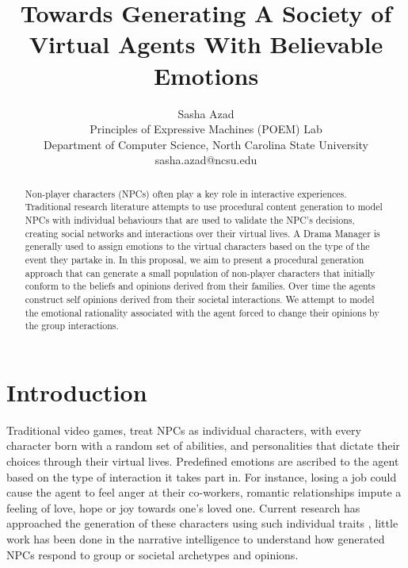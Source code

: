 \documentclass[letterpaper]{article}
\begin{document}
%

\title{Towards Generating A Society of Virtual Agents With Believable Emotions}
\author{Sasha Azad\\
    Principles of Expressive Machines (POEM) Lab \\ 
    Department of Computer Science, North Carolina State University\\
	sasha.azad@ncsu.edu\\
}
\maketitle

\begin{abstract}
Non-player characters (NPCs) often play a key role in interactive experiences. Traditional research literature attempts to use procedural content generation to model NPCs with individual behaviours that are used to validate the NPC's decisions, creating social networks and interactions over their virtual lives. A Drama Manager is generally used to assign emotions to the virtual characters based on the type of the event they partake in. In this proposal, we aim to present a procedural generation approach that can generate a small population of non-player characters that initially conform to the beliefs and opinions derived from their families. Over time the agents construct self opinions derived from their societal interactions. We attempt to model the emotional rationality associated with the agent forced to change their opinions by the group interactions.
\end{abstract}
 
\section{Introduction}

Traditional video games, treat NPCs as individual characters, with every character born with a random set of abilities, and personalities that dictate their choices through their virtual lives. Predefined emotions are ascribed to the agent based on the type of interaction it takes part in. For instance, losing a job could cause the agent to feel anger at their co-workers, romantic relationships impute a feeling of love, hope or joy towards one's loved one. Current research has approached the generation of these characters using such individual traits \cite{mateas2003faccade,young2004architecture,swartout2006toward}, little work has been done in the narrative intelligence to understand how generated NPCs respond to group or societal archetypes and opinions\cite{zyda2010designing,wang2014modeling}. 
\end{document}
